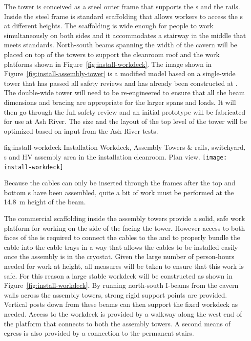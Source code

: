 The  tower is conceived as a steel outer frame that supports the s and the rails. Inside the steel frame is standard scaffolding that allows workers to access the s at different heights. 
The scaffolding is wide enough for people to work simultaneously on both sides and it accommodates a stairway in the middle that meets  standards. 
North-south beams spanning the width of the cavern will be placed on top of the towers to support the cleanroom roof and the work platforms shown in Figure~\ref{fig:install-workdeck}.
The image shown in Figure~\ref{fig:install-assembly-tower} is a modified model based on a single-wide  tower that has passed all safety reviews and has already been constructed at . 
The double-wide tower will need to be re-engineered to ensure that all the beam dimensions and bracing are appropriate for the larger spans and loads. 
It will then go through the full safety review and an initial prototype 
will be fabricated for use at Ash River. 
The size and the layout of the top level of the tower will be optimized based on input from the Ash River tests. 


\begin{dunefigure}{fig:install-workdeck}
  {Installation Workdeck, Assembly Towers \&  rails, switchyard, \coldbox{}s and HV assembly area in the installation cleanroom. Plan view. 
  }
\texttt{[image: install-workdeck]}
\end{dunefigure}

Because the cables can only be inserted through the  frames after the top and bottom s have been assembled, quite a bit 
of work must be performed at the \SI{14.8}{m} height of the  beam. 

The commercial scaffolding inside the  assembly towers 
provide a solid, safe work platform for working on the side of the  facing the tower. However access to both faces of the  is required to connect the cables to the  and to properly bundle the cable into the cable trays in a way that allows the cables to be installed easily once the assembly is in the cryostat. 
Given the large number of person-hours needed for work at height, all measures will be taken to ensure that this work is safe. 
For this reason a large stable  workdeck will be constructed as shown in Figure~\ref{fig:install-workdeck}.
By running north-south I-beams from the cavern walls across the assembly towers, strong rigid support points are provided. 
Vertical posts down from these beams can then support the fixed workdeck as needed. Access to the workdeck is provided by a walkway along the west end of the platform that connects to both the assembly towers. A second means of egress is also provided by a connection to the permanent stairs. 



